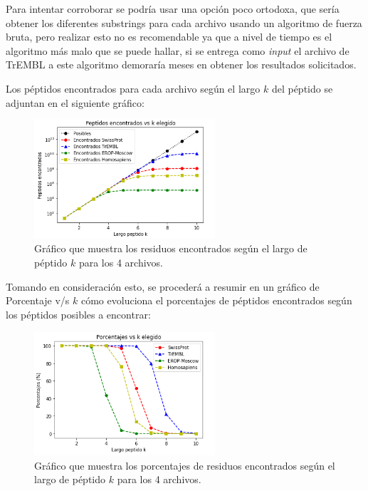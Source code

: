 Para intentar corroborar se podría usar una opción poco ortodoxa, que sería obtener los diferentes substrings para cada archivo usando un algoritmo de fuerza bruta, pero realizar esto no es recomendable ya que a nivel de tiempo es el algoritmo más malo que se puede hallar, si se entrega como \textit{input} el archivo de TrEMBL a este algoritmo demoraría meses en obtener los resultados solicitados.

Los péptidos encontrados para cada archivo según el largo $k$ del péptido se adjuntan en el siguiente gráfico:

\begin{figure}[h]
    \centering
    \includegraphics[width=0.6\textwidth]{./images/todosv1.png}
    \caption{Gráfico que muestra los residuos encontrados según el largo de péptido $k$ para los 4 archivos.}
    \label{fig:todos}
\end{figure}

Tomando en consideración esto, se procederá a resumir en un gráfico de Porcentaje v/s $k$ cómo evoluciona el porcentajes de péptidos encontrados según los péptidos posibles a encontrar:

\begin{figure}[h]
    \centering
    \includegraphics[width=0.6\textwidth]{./images/grafico1v1.png}
    \caption{Gráfico que muestra los porcentajes de residuos encontrados según el largo de péptido $k$ para los 4 archivos.}
    \label{fig:imple2}
\end{figure}

